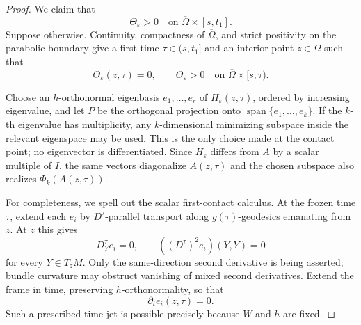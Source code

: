 \documentclass[10pt]{coll-l}
\theoremstyle{definition}
\theoremstyle{remark}
\numberwithin{section}{chapter}
\numberwithin{equation}{chapter}
\begin{document}
\begin{proof}
We claim that
\begin{equation}
 \Theta_\varepsilon>0
 \quad\text{on }\overline\Omega\times[s,t_1].           \label{eq:smp-barrier-strict}
\end{equation}
Suppose otherwise.  Continuity, compactness of
$\overline\Omega$, and strict positivity on the parabolic boundary give a
first time $\tau\in(s,t_1]$ and an interior point $z\in\Omega$ such that
\begin{equation}
 \Theta_\varepsilon(z,\tau)=0,
 \qquad
 \Theta_\varepsilon>0
 \quad\text{on }\overline\Omega\times[s,\tau).          \label{eq:smp-first-contact}
\end{equation}

Choose an $h$-orthonormal eigenbasis $e_1,\ldots,e_r$ of
$H_\varepsilon(z,\tau)$, ordered by increasing eigenvalue, and let $P$ be
the orthogonal projection onto
$\operatorname{span}\{e_1,\ldots,e_k\}$.  If the $k$-th eigenvalue has
multiplicity, any $k$-dimensional minimizing subspace inside the relevant
eigenspace may be used.  This is the only choice made at the contact point;
no eigenvector is differentiated.  Since $H_\varepsilon$ differs from $A$
by a scalar multiple of $I$, the same vectors diagonalize $A(z,\tau)$ and
the chosen subspace also realizes $\Phi_k(A(z,\tau))$.

For completeness, we spell out the scalar first-contact calculus.  At the
frozen time $\tau$, extend each $e_i$ by $D^\tau$-parallel transport along
$g(\tau)$-geodesics emanating from $z$.  At $z$ this gives
\begin{equation}
 D^\tau_Ye_i=0,
 \qquad
 ((D^\tau)^2e_i)(Y,Y)=0                                 \label{eq:smp-frame-spatial-jets}
\end{equation}
for every $Y\in T_zM$.  Only the same-direction second derivative is being
asserted; bundle curvature may obstruct vanishing of mixed second
derivatives.  Extend the frame in time, preserving $h$-orthonormality, so
that
\begin{equation}
                    \partial_te_i(z,\tau)=0.             \label{eq:smp-frame-time-jet}
\end{equation}
Such a prescribed time jet is possible precisely because $W$ and $h$ are
fixed.


\end{proof}
\end{document}
